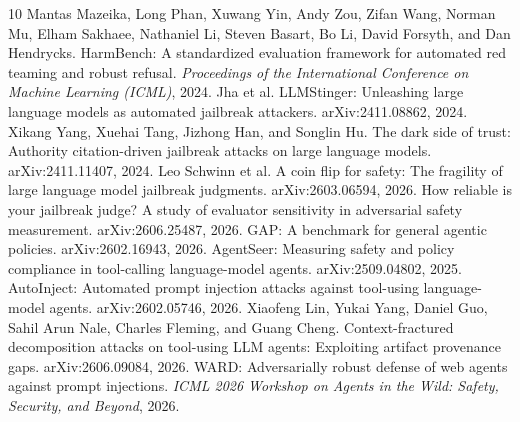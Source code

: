 \documentclass[10pt]{article}
\begin{document}
\begin{thebibliography}{10}
 Mantas Mazeika, Long Phan, Xuwang Yin, Andy Zou, Zifan Wang, Norman Mu, Elham Sakhaee, Nathaniel Li, Steven Basart, Bo Li, David Forsyth, and Dan Hendrycks. HarmBench: A standardized evaluation framework for automated red teaming and robust refusal. \emph{Proceedings of the International Conference on Machine Learning (ICML)}, 2024.
 Jha et al. LLMStinger: Unleashing large language models as automated jailbreak attackers. arXiv:2411.08862, 2024.
 Xikang Yang, Xuehai Tang, Jizhong Han, and Songlin Hu. The dark side of trust: Authority citation-driven jailbreak attacks on large language models. arXiv:2411.11407, 2024.
 Leo Schwinn et al. A coin flip for safety: The fragility of large language model jailbreak judgments. arXiv:2603.06594, 2026.
 How reliable is your jailbreak judge? A study of evaluator sensitivity in adversarial safety measurement. arXiv:2606.25487, 2026.
 GAP: A benchmark for general agentic policies. arXiv:2602.16943, 2026.
 AgentSeer: Measuring safety and policy compliance in tool-calling language-model agents. arXiv:2509.04802, 2025.
 AutoInject: Automated prompt injection attacks against tool-using language-model agents. arXiv:2602.05746, 2026.
 Xiaofeng Lin, Yukai Yang, Daniel Guo, Sahil Arun Nale, Charles Fleming, and Guang Cheng. Context-fractured decomposition attacks on tool-using LLM agents: Exploiting artifact provenance gaps. arXiv:2606.09084, 2026.
 WARD: Adversarially robust defense of web agents against prompt injections. \emph{ICML 2026 Workshop on Agents in the Wild: Safety, Security, and Beyond}, 2026.
\end{thebibliography}
\end{document}
